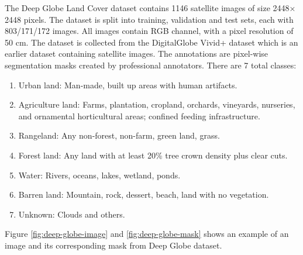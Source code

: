 The Deep Globe Land Cover dataset \cite{deep-globe} contains 1146 satellite images of size 2448×
2448 pixels. The dataset is split into training, validation and test sets, each with 803/171/172 images. All images contain RGB channel, with a pixel resolution of 50 cm. The dataset is  collected from the DigitalGlobe Vivid+ dataset which is an earlier dataset containing satellite images. The annotations are pixel-wise segmentation masks created by professional annotators. There are 7 total classes:

\begin{enumerate}
    \item Urban land: Man-made, built up areas with human artifacts.
    \item Agriculture land: Farms, plantation, cropland, orchards, vineyards, nurseries, and ornamental horticultural areas; confined feeding infrastructure.
    \item Rangeland: Any non-forest, non-farm, green land, grass.
    \item Forest land: Any land with at least 20\% tree crown density plus clear cuts.
    \item Water: Rivers, oceans, lakes, wetland, ponds.
    \item Barren land: Mountain, rock, dessert, beach, land with no vegetation.
    \item Unknown: Clouds and others.
\end{enumerate}


Figure \ref{fig:deep-globe-image} and \ref{fig:deep-globe-mask} shows an example of an image and its corresponding mask from Deep Globe dataset.


